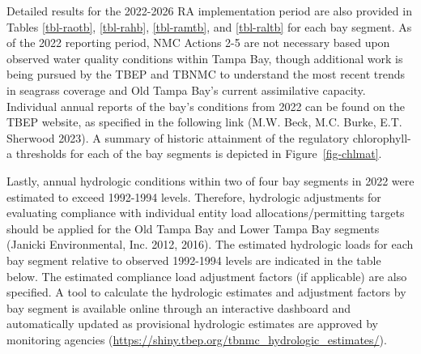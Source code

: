 \documentclass[
  letterpaper,
  DIV=11,
  numbers=noendperiod]{scrreprt}
\begin{document}
Detailed results for the 2022-2026 RA implementation period are also
provided in Tables \ref{tbl-raotb}, \ref{tbl-rahb}, \ref{tbl-ramtb}, and
\ref{tbl-raltb} for each bay segment. As of the 2022 reporting period,
NMC Actions 2-5 are not necessary based upon observed water quality
conditions within Tampa Bay, though additional work is being pursued by
the TBEP and TBNMC to understand the most recent trends in seagrass
coverage and Old Tampa Bay's current assimilative capacity. Individual
annual reports of the bay's conditions from 2022 can be found on the
TBEP website, as specified in the following link (M.W. Beck, M.C. Burke,
E.T. Sherwood 2023). A summary of historic attainment of the regulatory
chlorophyll-a thresholds for each of the bay segments is depicted in
Figure~\ref{fig-chlmat}.

Lastly, annual hydrologic conditions within two of four bay segments in
2022 were estimated to exceed 1992-1994 levels. Therefore, hydrologic
adjustments for evaluating compliance with individual entity load
allocations/permitting targets should be applied for the Old Tampa Bay
and Lower Tampa Bay segments (Janicki Environmental, Inc. 2012, 2016).
The estimated hydrologic loads for each bay segment relative to observed
1992-1994 levels are indicated in the table below. The estimated
compliance load adjustment factors (if applicable) are also specified. A
tool to calculate the hydrologic estimates and adjustment factors by bay
segment is available online through an interactive dashboard and
automatically updated as provisional hydrologic estimates are approved
by monitoring agencies
(\url{https://shiny.tbep.org/tbnmc_hydrologic_estimates/}).
\end{document}
